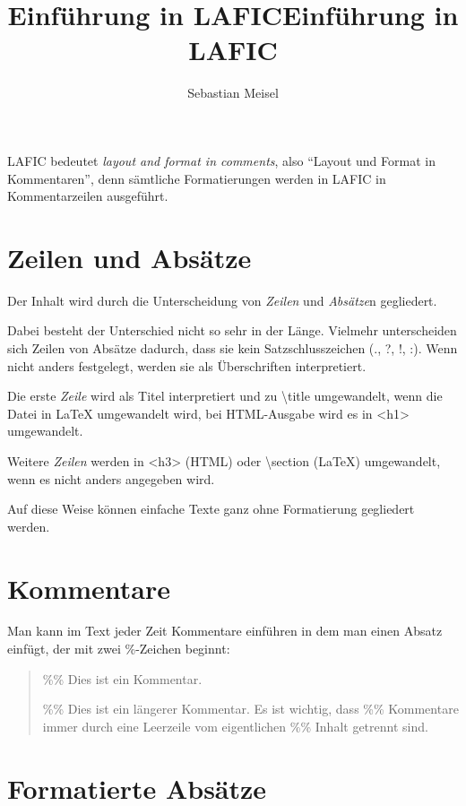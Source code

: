 \documentclass{scrartcl}
\title{Einführung in LAFIC}
\title{Einführung in LAFIC}
\author{Sebastian Meisel}
\begin{document}
\maketitle


LAFIC bedeutet \textit{layout and format in comments}, also "`Layout
und Format in Kommentaren"', denn sämtliche Formatierungen
werden in LAFIC in Kommentarzeilen ausgeführt.

\section{Zeilen und Absätze}

Der Inhalt wird durch die Unterscheidung von  \emph{Zeilen} und
\emph{Absätze}n gegliedert.

Dabei besteht der Unterschied nicht so sehr in der
Länge. Vielmehr unterscheiden sich Zeilen von Absätze
dadurch, dass sie kein Satzschlusszeichen (., ?, !, :).
Wenn nicht anders festgelegt, werden sie als Überschriften
interpretiert.

Die erste \emph{Zeile} wird als Titel interpretiert und zu \textbackslash title
umgewandelt, wenn die Datei in LaTeX umgewandelt wird, bei
HTML-Ausgabe wird es in <h1> umgewandelt.

Weitere \emph{Zeilen} werden in <h3> (\textsc{HTML}) oder \textbackslash section
(LaTeX) umgewandelt, wenn es nicht anders angegeben wird.

Auf diese Weise können einfache Texte ganz ohne Formatierung
gegliedert werden.

\section{Kommentare}

Man kann im Text jeder Zeit Kommentare einführen in dem man einen Absatz einfügt, der mit zwei \%-Zeichen beginnt:

\begin{quote}
  \%\% Dies ist ein Kommentar.

  \%\% Dies ist ein längerer Kommentar. Es ist wichtig, dass
  \%\% Kommentare immer durch eine Leerzeile vom eigentlichen
  \%\% Inhalt getrennt sind.

\end{quote}



\section{Formatierte Absätze}
\end{document}

